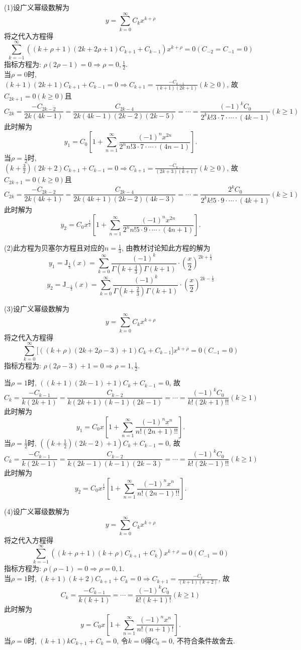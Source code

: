 \begin{solve}
(1)设广义幂级数解为
\[y=\sum_{k=0}^{\infty}C_kx^{k+\rho}\]
将之代入方程得
\[\sum_{k=-1}^{\infty}\left((k+\rho+1)(2k+2\rho+1)C_{k+1}+C_{k-1}\right)x^{k+\rho}=0(C_{-2}=C_{-1}=0)\]
指标方程为: $\rho(2\rho-1)=0\Rightarrow\rho=0,\frac{1}{2}$.\\
当$\rho=0$时, $(k+1)(2k+1)C_{k+1}+C_{k-1}=0\Rightarrow C_{k+1}=\frac{-C_{k-1}}{(k+1)(2k+1)}(k\geq0)$, 故$C_{2k+1}=0(k\geq0)$且
\[C_{2k}=\frac{-C_{2k-2}}{2k(4k-1)}=\frac{C_{2k-4}}{2k(4k-1)(2k-2)(2k-5)}=\cdots=\frac{(-1)^kC_0}{2^kk!3\cdot7\cdot\cdots\cdot(4k-1)}(k\geq1)\]
此时解为
\[y_1=C_0\left[1+\sum_{n=1}^{\infty}\frac{(-1)^nx^{2n}}{2^nn!3\cdot7\cdot\cdots\cdot(4n-1)}\right].\]
当$\rho=\frac{1}{2}$时, $(k+\frac{3}{2})(2k+2)C_{k+1}+C_{k-1}=0\Rightarrow C_{k+1}=\frac{-C_{k-1}}{(2k+3)(k+1)}(k\geq0)$, 故$C_{2k+1}=0(k\geq0)$且
\[C_{2k}=\frac{-C_{2k-2}}{2k(4k+1)}=\frac{C_{2k-4}}{2k(4k+1)(2k-2)(4k-3)}=\cdots=\frac{2^kC_0}{2^kk!5\cdot9\cdot\cdots\cdot(4k+1)}(k\geq1)\]
此时解为
\[y_2=C_0x^{\frac{1}{2}}\left[1+\sum_{n=1}^{\infty}\frac{(-1)^nx^{2n}}{2^nn!5\cdot9\cdot\cdots\cdot(4n+1)}\right].\]

(2)此方程为贝塞尔方程且对应的$n=\frac{1}{3}$, 由教材讨论知此方程的解为
\[y_1=\mathrm{J}_{\frac{1}{3}}(x)=\sum_{k=0}^{\infty}\frac{(-1)^k}{\Gamma\left(k+\frac{4}{3}\right)\Gamma(k+1)}\cdot\left(\frac{x}{2}\right)^{2k+\frac{1}{3}}\]
\[y_2=\mathrm{J}_{-\frac{1}{3}}(x)=\sum_{k=0}^{\infty}\frac{(-1)^k}{\Gamma\left(k+\frac{2}{3}\right)\Gamma(k+1)}\cdot\left(\frac{x}{2}\right)^{2k-\frac{1}{3}}\]

(3)设广义幂级数解为
\[y=\sum_{k=0}^{\infty}C_kx^{k+\rho}\]
将之代入方程得
\[\sum_{k=0}^{\infty}\big[((k+\rho)(2k+2\rho-3)+1)C_k+C_{k-1}\big]x^{k+\rho}=0(C_{-1}=0)\]
指标方程为: $\rho(2\rho-3)+1=0\Rightarrow\rho=1,\frac{1}{2}$.

当$\rho=1$时, $((k+1)(2k-1)+1)C_k+C_{k-1}=0$, 故
\[C_k=\frac{-C_{k-1}}{k(2k+1)}=\frac{C_{k-2}}{k(2k+1)(k-1)(2k-1)}=\cdots=\frac{(-1)^kC_0}{k!(2k+1)!!}(k\geq1)\]
此时解为
\[y_1=C_0x\left[1+\sum_{n=1}^{\infty}\frac{(-1)^nx^n}{n!(2n+1)!!}\right].\]
当$\rho=\frac{1}{2}$时, $((k+\frac{1}{2})(2k-2)+1)C_k+C_{k-1}=0$, 故
\[C_k=\frac{-C_{k-1}}{k(2k-1)}=\frac{C_{k-2}}{k(2k-1)(k-1)(2k-3)}=\cdots=\frac{(-1)^kC_0}{k!(2k-1)!!}(k\geq1)\]
此时解为
\[y_2=C_0x^{\frac{1}{2}}\left[1+\sum_{n=1}^{\infty}\frac{(-1)^nx^n}{n!(2n-1)!!}\right].\]

(4)设广义幂级数解为
\[y=\sum_{k=0}^{\infty}C_kx^{k+\rho}\]
将之代入方程得
\[\sum_{k=-1}^{\infty}((k+\rho+1)(k+\rho)C_{k+1}+C_k)x^{k+\rho}=0(C_{-1}=0)\]
指标方程为: $\rho(\rho-1)=0\Rightarrow\rho=0,1$.\\
当$\rho=1$时, $(k+1)(k+2)C_{k+1}+C_k=0\Rightarrow C_{k+1}=\frac{-C_k}{(k+1)(k+2)}$, 故
\[C_k=\frac{-C_{k-1}}{k(k+1)}=\cdots=\frac{(-1)^kC_0}{k!(k+1)!}(k\geq1)\]
此时解为
\[y=C_0x\left[1+\sum_{n=1}^{\infty}\frac{(-1)^nx^n}{n!(n+1)!}\right].\]
当$\rho=0$时, $(k+1)kC_{k+1}+C_k=0$, 令$k=0$得$C_0=0$, 不符合条件故舍去.


\end{solve}
